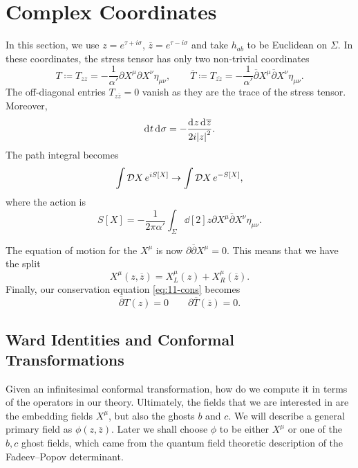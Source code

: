 \section{Complex Coordinates}%
\label{sec:complex_coordinates}

In this section, we use $z = e^{\tau + i \sigma}$, $\overline{z}{} = e^{\tau -i \sigma}$ and take $h_{ab}$ to be Euclidean on $\Sigma$.
In these coordinates, the stress tensor has only two non-trivial coordinates
\begin{equation}
  T \coloneqq T_{zz} =-\frac{1}{\alpha'} \partial X^{\mu} \partial X^{\nu} \eta_{\mu\nu}, \qquad 
  \overline{T}{} \coloneqq T_{\overline{zz}} =-\frac{1}{\alpha'} \overline{\partial}{} X^{\mu} \overline{\partial}{} X^{\nu} \eta_{\mu\nu}.
\end{equation}
The off-diagonal entries $T_{z\overline{z}{}} = 0$ vanish as they are the trace of the stress tensor.
Moreover, 
\begin{equation}
  \dd[]{t} \dd[]{\sigma} = -\frac{\dd[]{z} \dd[]{\overline{z}{}}}{2i \abs{z}^2}.
\end{equation}
The path integral becomes
\begin{equation}
  \int \mathop{\mathcal{D} X} e^{i S[X]} \to \int \mathop{\mathcal{D} X} e^{-S[X]},
\end{equation}
where the action is
\begin{equation}
  S[X] = -\frac{1}{2\pi \alpha'} \int_\Sigma \dd[2]{z} \partial X^{\mu} \overline{\partial}{} X^{\nu} \eta_{\mu\nu}.
\end{equation}

The equation of motion for the $X^{\mu}$  is now $\partial \overline{\partial}{} X^{\mu} = 0$. This means that we have the split
\begin{equation}
  X^{\mu}(z, \overline{z}{}) = X^{\mu}_L (z) + X^{\mu}_R(\overline{z}{}).
\end{equation}
Finally, our conservation equation \eqref{eq:11-cons} becomes
\begin{equation}
  \overline{\partial}{}T(z) = 0 \qquad \partial \overline{T}{}(\overline{z}{}) = 0.
\end{equation}

\subsection{Ward Identities and Conformal Transformations}%
\label{sub:ward_identities_and_conformal_transformations}

Given an infinitesimal conformal transformation, how do we compute it in terms of the operators in our theory.
Ultimately, the fields that we are interested in are the embedding fields $X^{\mu}$, but also the ghosts $b$ and $c$.
We will describe a general primary field as $\phi(z, \overline{z}{})$. Later we shall choose $\phi$ to be either $X^{\mu}$ or one of the $b, c$ ghost fields, which came from the quantum field theoretic description of the Fadeev--Popov determinant.

